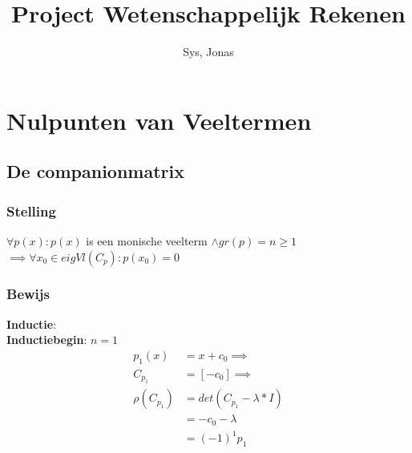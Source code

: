 \documentclass{article}
\title{Project Wetenschappelijk Rekenen}
\author{Sys, Jonas}
\begin{document}
\newcommand{\sgntxt}[2]{\stackrel{\text{#2}}{#1}}
\begin{titlepage}
 \maketitle
\end{titlepage}

\tableofcontents
\pagebreak

\section{Nulpunten van Veeltermen}
\subsection{De companionmatrix}
\subsubsection{Stelling}
\(\forall p(x): p(x)\) is een monische veelterm \(\land gr(p) = n \geq 1 \) \\
\(\implies \forall x_0 \in eigVl(C_p): p(x_0) = 0\)

\subsubsection{Bewijs}
\textbf{Inductie}: \\

\textbf{Inductiebegin}: \(n = 1\)
\begin{align*}
 p_1(x) &= x + c_0 \implies \\
 C_{p_1} &= [-c_0] \implies \\
 \rho(C_{p_1}) &= det(C_{p_1} - \lambda * I) \\
 &= -c_0 - \lambda \\
 &= (-1)^1 p_1
\end{align*}
\end{document}
